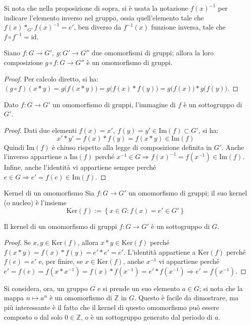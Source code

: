 \documentclass[11pt, a4paper]{scrartcl}
\theoremstyle{definition}
\numberwithin{esempio}{section}
\theoremstyle{definition}
\numberwithin{obs}{section}
\numberwithin{nota}{section}
\numberwithin{equation}{subsection}
\begin{document}
\noindent Si nota che nella proposizione di sopra, si \`e usata la notazione $f(x)^{-1} $ per indicare l'elemento inverso nel gruppo, ossia quell'elemento tale che $f(x) *_{G'} f(x)^{-1} = e'$, ben diverso da $f^{-1} (x)$ funzione inversa, tale che $f \circ f^{-1}=\mathrm{id} $.
\begin{prop}
	{}{}
	Siano $f:G\to G', \ g:G' \to G''$ due omomorfismi di gruppi; allora la loro composizione $g \circ f : G \to G''$ \`e un omomorfismo di gruppi.
	\begin{proof}
		Per calcolo diretto, si ha: $(g\circ f)(x*y) = g\big(f(x*y)\big) = g \big(f(x) * f(y)\big) = g\big(f(x)\big) * g\big(f(y)\big)$.
	\end{proof}
\end{prop}
\begin{prop}
	{}{}
	Dato $f:G \to G'$ un omomorfismo di gruppi, l'immagine di $f$ \`e un sottogruppo di $G'$.
	\begin{proof}
		Dati due elementi $f(x) = x', \ f(y) = y' \in \mathrm{Im} (f) \subset G'$, si ha:
		\[
		x' * y' = f(x) * f(y) = f(x*y) \in \mathrm{Im} (f)
		\] 
		Quindi $\mathrm{Im} (f)$ \`e chiuso rispetto alla legge di composizione definita in $G'$. Anche l'inverso appartiene a $\mathrm{Im} (f)$ perch\'e $x^{-1} \in G \Rightarrow f(x)^{-1} = f(x^{-1} ) \in \mathrm{Im} (f) $. Infine, anche l'identit\`a vi appartiene sempre perch\'e $e \in G \Rightarrow e' = f(e) \in \mathrm{Im} (f)$.
	\end{proof}
\end{prop}
\begin{definizione}
	{Kernel di un omomorfismo}{}
	Sia $f:G \to G'$ un omomorfismo di gruppi; il suo kernel (o nucleo) \`e l'insieme
	\[
	\mathrm{Ker} (f) := \left\{ x \in G : f(x) = e' \in G' \right\} 
	\] 
\end{definizione}
\begin{prop}
	{}{}
	Il kernel di un omomorfismo di gruppi $f:G\to G'$ \`e un sottogruppo di $G$.
	\begin{proof}
		Se $x, y \in \mathrm{Ker} (f)$, allora $x*y \in \mathrm{Ker} (f)$ perch\'e $f(x*y) = f(x) * f(y) = e' * e' = e'$. L'identit\`a appartiene a $\mathrm{Ker} (f)$ perch\'e $f(e) = e'$ e, per finire, se $x \in \mathrm{Ker} (f)$, anche $x^{-1} $ vi appartiene perch\'e $e' = f(e)= f(x * x^{-1} ) = f(x) * f(x^{-1} ) = e' * f(x^{-1} ) \Rightarrow e' = f(x^{-1} )$.
	\end{proof}
\end{prop}
Si considera, ora, un gruppo $G$ e si prende un suo elemento $a \in G$; si nota che la mappa $n\mapsto a^n$ \`e un omomorfismo di $\mathbb{Z}$ in $G$. Questo \`e facile da dimostrare, ma pi\`u interessante \`e il fatto che il kernel di questo omomorfismo pu\`o essere composto o dal solo $0 \in \mathbb{Z}$, o \`e un sottogruppo generato dal periodo di $a$.
\end{document}
